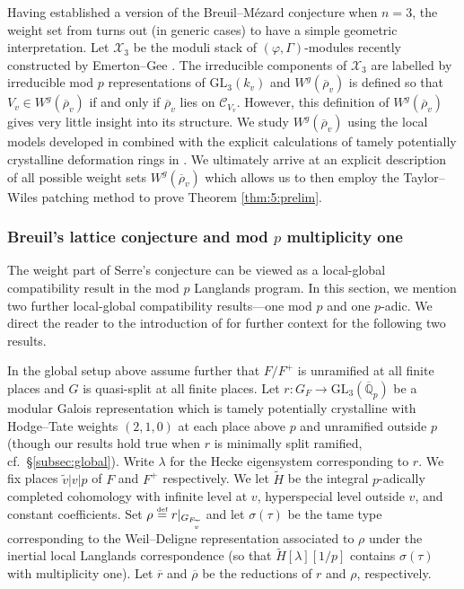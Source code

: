\documentclass[oneside,a4paper,english, 11pt]{amsart}
\theoremstyle{plain}
\theoremstyle{plain}
\theoremstyle{plain}
\theoremstyle{plain}
\theoremstyle{plain}
\theoremstyle{plain}
\theoremstyle{definition}
\theoremstyle{definition}
\theoremstyle{definition}
\theoremstyle{remark}
\numberwithin{equation}{section}
\newcommand{\Q}{\mathbb{Q}}
\newcommand{\cC}{\mathcal{C}}
\newcommand{\cX}{\mathcal{X}}
\newcommand{\GL}{\mathrm{GL}}
\newcommand{\tld}[1]{\widetilde{#1}}
\newcommand{\rbar}{\overline{r}}
\newcommand{\rhobar}{\overline{\rho}}
\newcommand{\defeq}{\stackrel{\textrm{\tiny{def}}}{=}}
\newcommand{\ra}{\rightarrow}
\begin{document}
Having established a version of the Breuil--M\'ezard conjecture when $n=3$, the weight set from \cite{GHS} turns out (in generic cases) to have a simple geometric interpretation. 
Let $\cX_3$ be the moduli stack of $(\varphi,\Gamma)$-modules recently constructed by Emerton--Gee \cite{EGstack}. %
The irreducible components of $\cX_3$ are labelled by irreducible mod $p$ representations of $\GL_3(k_v)$ and $W^g(\rhobar_v)$ is defined so that $V_v \in W^g(\rhobar_v)$ if and only if $\rhobar_v$ lies on $\cC_{V_v}$. 
However, this definition of $W^g(\rhobar_v)$ gives very little insight into its structure. 
We study $W^g(\rhobar_v)$ using the local models developed in \cite{MLM} combined with the explicit calculations of tamely potentially crystalline deformation rings in \cite{LLLM, LLLM2}.   We ultimately arrive at an explicit description of all possible weight sets $W^g(\rhobar_v)$ which allows us to then employ the Taylor--Wiles patching method to prove Theorem \ref{thm:5:prelim}. 
%

%


\subsubsection{Breuil's lattice conjecture and mod $p$ multiplicity one}

The weight part of Serre's conjecture can be viewed as a local-global compatibility result in the mod $p$ Langlands program.
In this section, we mention two further local-global compatibility results---one mod $p$ and one $p$-adic.
We direct the reader to the introduction of \cite{LLLM2} for further context for the following two results. 

%
In the global setup above assume further that $F/F^+$ is unramified at all finite places and $G$ is quasi-split at all finite places.
Let $r:G_F \ra \GL_3(\overline{\Q}_p)$ be a modular Galois representation which is tamely potentially crystalline with Hodge--Tate weights $(2,1,0)$ at each place above $p$ and unramified outside $p$ (though our results hold true when $r$ is minimally split ramified, cf.~\S \ref{subsec:global}).
Write $\lambda$ for the Hecke eigensystem corresponding to $r$. %
We fix places $\tld{v}|v|p$ of $F$ and $F^+$ respectively.
We let $\tld{H}$ be the integral $p$-adically completed cohomology with infinite level at $v$, hyperspecial level outside $v$, and constant coefficients.
Set $\rho\defeq r|_{G_{F_{\tld{v}}}}$ and let $\sigma(\tau)$ be the tame type corresponding to the Weil--Deligne representation associated to $\rho$ under the inertial local Langlands correspondence (so that $\tld{H}[\lambda][1/p]$ contains $\sigma(\tau)$ with multiplicity one). 
Let $\rbar$ and $\rhobar$ be the reductions of $r$ and $\rho$, respectively. 
\end{document}
